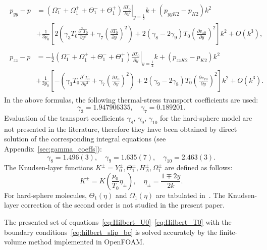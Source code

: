 \documentclass[review]{elsarticle}
\newcommand{\pder}[2][]{\frac{\partial#1}{\partial#2}}
\newcommand{\pderdual}[2][]{\frac{\partial^2#1}{\partial#2^2}}
\newcommand{\OO}[1]{O\left(#1\right)}
\begin{document}
\begin{gather}
    \begin{aligned}
    p_{yy} - p &= (\Omega_1^-+\Omega_1^+ + \Theta_1^-+\Theta_1^+)\left.\pder[T_0]{y}\right|_{y=\frac12}k
        + (p_{yyK2}-p_{K2})k^2 \\
        &+ \frac1{3p_0}\left[2\left(\gamma_3 T_0 \pderdual[T_0]{y} + \gamma_7\left(\pder[T_0]{y}\right)^2\right)
        + 2(\gamma_8-2\gamma_9)T_0\left(\pder[v_{x0}]{y}\right)^2\right]k^2 + \OO{k^3},
    \end{aligned}\label{eq:Hilbert_Pyy}\\
    \begin{aligned}
    p_{zz} - p &= -\frac12 (\Omega_1^-+\Omega_1^+ + \Theta_1^-+\Theta_1^+)\left.\pder[T_0]{y}\right|_{y=\frac12}k
        + (p_{zzK2}-p_{K2})k^2 \\
        &+ \frac1{3p_0}\left[-\left(\gamma_3 T_0 \pderdual[T_0]{y} + \gamma_7\left(\pder[T_0]{y}\right)^2\right)
        + 2(\gamma_9-2\gamma_8)T_0\left(\pder[v_{x0}]{y}\right)^2\right]k^2 + \OO{k^3}.
    \end{aligned}\label{eq:Hilbert_Pzz}
\end{gather}
In the above formulas, the following thermal-stress transport coefficients are used:
\begin{equation}\label{eq:gamma_tabular}
    \gamma_3 = 1.947906335, \quad \gamma_7 = 0.189201.
\end{equation}
Evaluation of the transport coefficients \(\gamma_8\), \(\gamma_9\), \(\gamma_{10}\)
for the hard-sphere model are not presented in the literature,
therefore they have been obtained by direct solution of the corresponding integral equations
(see Appendix~\ref{sec:gamma_coeffs}):
\begin{equation}\label{eq:gamma_numerical}
    \gamma_8 = 1.496(3), \quad \gamma_9 = 1.635(7), \quad \gamma_{10} = 2.463(3).
\end{equation}
The Knudsen-layer functions \(K^\pm = Y_0^\pm, \Theta_1^\pm, H_A^\pm, \Omega_1^\pm\)
are defined as follows:
\begin{equation}\label{eq:nonlinear_knudsen_functions}
     K^\pm = K\left(\frac{p_0}{T_0}\eta_\pm\right), \quad \eta_\pm = \frac{1 \mp 2y}{2k}.
\end{equation}
For hard-sphere molecules, \(\Theta_1(\eta)\) and \(\Omega_1(\eta)\)
are tabulated in~\citet{Ohwada1992, Sone2002, Sone2007, Takata2015}.
The Knudsen-layer correction of the second order is not studied in the present paper.

The presented set of equations~\eqref{eq:Hilbert_U0}--\eqref{eq:Hilbert_T0}
with the boundary conditions~\eqref{eq:hilbert_slip_bc}
is solved accurately by the finite-volume method
implemented in OpenFOAM\textregistered{}.
\end{document}

